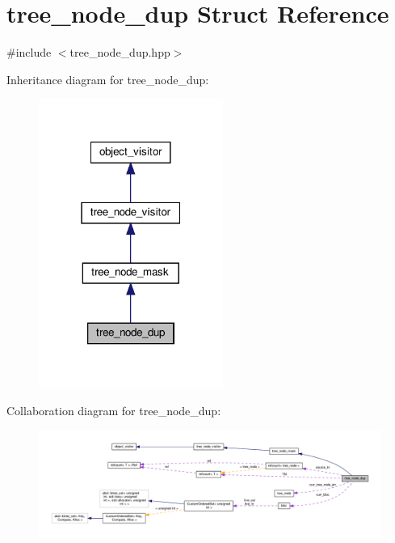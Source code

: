 \hypertarget{structtree__node__dup}{}\section{tree\+\_\+node\+\_\+dup Struct Reference}
\label{structtree__node__dup}


{\ttfamily \#include $<$tree\+\_\+node\+\_\+dup.\+hpp$>$}



Inheritance diagram for tree\+\_\+node\+\_\+dup\+:
\nopagebreak
\begin{figure}[H]
\begin{center}
\leavevmode
\includegraphics[width=171pt]{d6/db1/structtree__node__dup__inherit__graph}
\end{center}
\end{figure}


Collaboration diagram for tree\+\_\+node\+\_\+dup\+:
\nopagebreak
\begin{figure}[H]
\begin{center}
\leavevmode
\includegraphics[width=350pt]{d7/d8f/structtree__node__dup__coll__graph}
\end{center}
\end{figure}
